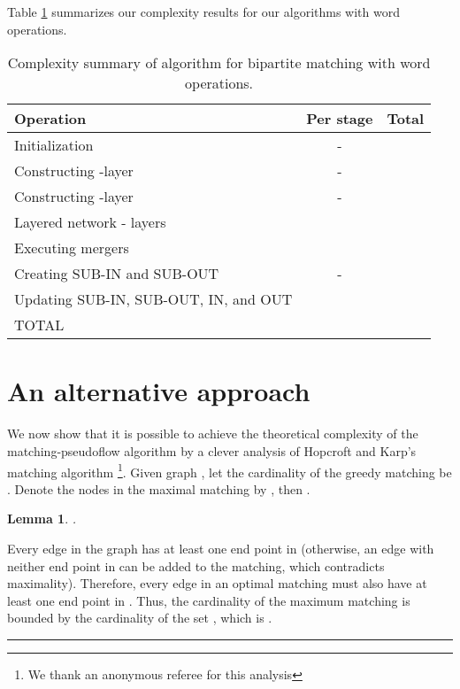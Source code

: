 \documentclass{article}
\newtheorem{lemma}{Lemma}[section]
\newenvironment{proof}[1][Proof:]{\begin{trivlist}
\item[\hskip \labelsep {\bfseries #1}]}{\end{trivlist}}
\newcommand{\qed}{\hfill \rule{2.5mm}{2.5mm}}
\begin{document}
Table \ref{Table:complexity3} summarizes our complexity results for our algorithms with word operations.

\begin{table}[ht]
\begin{center}
\begin{tabular}{||l|c|c||} \hline
\hline Operation & Per stage & Total\\
\hline
Initialization & - & \\
Constructing -layer & - & \\
Constructing -layer & -&  \\
Layered network - layers  &  & \\
Executing mergers &  & \\
Creating SUB-IN and SUB-OUT & - &  \\
Updating SUB-IN, SUB-OUT, IN, and OUT &  &  \\
\hline
TOTAL &
\multicolumn{2}{|c||}{}\\ \hline
\hline
\end{tabular}
\caption{\label{Table:complexity3}Complexity summary of algorithm for bipartite matching with word operations.}
\end{center}
\end{table}

\section{An alternative approach}
\label{sec:alternative}

We now show that it is possible to achieve the theoretical complexity of the {\sf matching-pseudoflow} algorithm by a clever analysis of Hopcroft and Karp's matching algorithm \cite{HopK73}\footnote{We thank an anonymous referee for this analysis}. Given  graph , let the cardinality of the greedy matching be . Denote the nodes in the maximal matching by , then .

\begin{lemma}
\label{lem:altGraphSize}
.
\end{lemma}
\begin{proof}
Every edge in the graph has at least one end point in  (otherwise, an edge with neither end point in  can be added to the matching, which contradicts maximality). Therefore, every edge in an optimal matching must also have at least one end point in .  Thus, the cardinality of the maximum matching is bounded by the cardinality of the set , which is . \qed
\end{proof}
\end{document}
